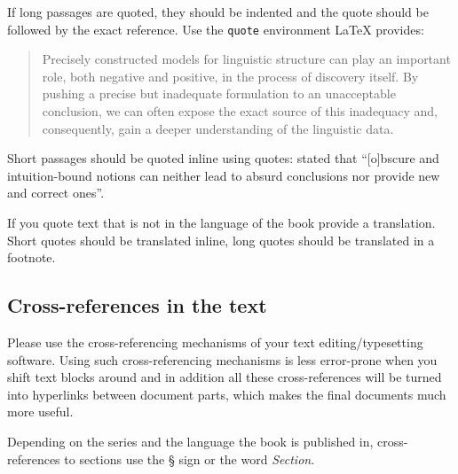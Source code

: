 If long passages are quoted, they should be indented and the quote should be followed by the exact reference. Use the \verb+quote+ environment \LaTeX\xspace provides:
\begin{quote}
Precisely constructed models for linguistic structure can play an
important role, both negative and positive, in the process of discovery 
itself. By pushing a precise but inadequate formulation to
an unacceptable conclusion, we can often expose the exact source
of this inadequacy and, consequently, gain a deeper understanding
of the linguistic data.
\citep[5]{Chomsky57a}
\end{quote}
%
Short passages should be quoted inline using quotes: \citet[5]{Chomsky57a} stated that ``[o]bscure
  and intuition-bound notions can neither lead to absurd conclusions nor provide new and
correct ones''.

If you quote text that is not in the language of the book provide a translation. Short quotes should
be translated inline, long quotes should be translated in a footnote.




\subsection{Cross-references in the text}

Please use the cross-referencing mechanisms of your text editing/typesetting software. Using such
cross-referencing mechanisms is less error-prone when you shift text blocks around and in addition
all these cross-references will be turned into hyperlinks between document parts, which makes the
final documents much more useful.


 
Depending on the series and the language the book is published in, cross-references to sections use the § sign or the word \emph{Section}. 



